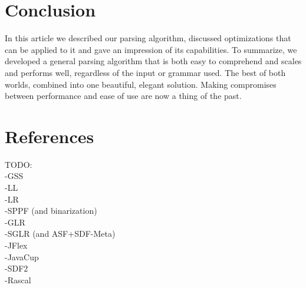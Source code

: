 \documentclass[a4paper,10pt]{article}
\begin{document}
\section{Conclusion}

In this article we described our parsing algorithm, discussed optimizations that can be applied to it and gave an impression of its capabilities. To summarize, we developed a general parsing algorithm that is both easy to comprehend and scales and performs well, regardless of the input or grammar used. The best of both worlds, combined into one beautiful, elegant solution. Making compromises between performance and ease of use are now a thing of the past.

\pagebreak
\section{References}

TODO:\\
-GSS\\
-LL\\
-LR\\
-SPPF (and binarization)\\
-GLR\\
-SGLR (and ASF+SDF-Meta)\\
-JFlex\\
-JavaCup\\
-SDF2\\
-Rascal
\end{document}
